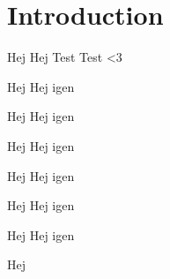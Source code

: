 \chapter{Introduction}
Hej Hej Test Test <3



\begin{defn}{Hej}
Hej igen
\end{defn}

\begin{thmx}{Hej}
Hej igen
\end{thmx}


\begin{lem}{Hej}
Hej igen
\end{lem}

\begin{prop}{Hej}
Hej igen
\end{prop}

\begin{kor}{Hej}
Hej igen
\end{kor}

\begin{exmp}{Hej}
Hej igen
\end{exmp}

\begin{bev}
Hej
\end{bev}